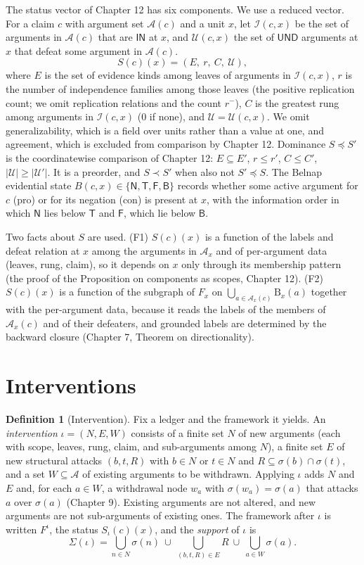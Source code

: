 \documentclass[11pt]{article}
\theoremstyle{plain}
\theoremstyle{definition}
\newtheorem{definition}[theorem]{Definition}
\theoremstyle{remark}
\newcommand{\IN}{\textsf{IN}}
\newcommand{\UND}{\textsf{UND}}
\newcommand{\Bc}{\mathrm{B}}
\begin{document}
The status vector of Chapter 12 has six components. We use a reduced vector. For a claim $c$ with argument set $\mathcal A(c)$ and a unit $x$, let $\mathcal I(c,x)$ be the set of arguments in $\mathcal A(c)$ that are $\IN$ at $x$, and $\mathcal U(c,x)$ the set of $\UND$ arguments at $x$ that defeat some argument in $\mathcal A(c)$.
\[
S(c)(x)=(E,\ r,\ C,\ \mathcal U),
\]
where $E$ is the set of evidence kinds among leaves of arguments in $\mathcal I(c,x)$, $r$ is the number of independence families among those leaves (the positive replication count; we omit replication relations and the count $r^-$), $C$ is the greatest rung among arguments in $\mathcal I(c,x)$ ($0$ if none), and $\mathcal U=\mathcal U(c,x)$. We omit generalizability, which is a field over units rather than a value at one, and agreement, which is excluded from comparison by Chapter 12. Dominance $S\preceq S'$ is the coordinatewise comparison of Chapter 12: $E\subseteq E'$, $r\le r'$, $C\le C'$, $|\mathcal U|\ge|\mathcal U'|$. It is a preorder, and $S\prec S'$ when also not $S'\preceq S$. The Belnap evidential state $B(c,x)\in\{\mathsf N,\mathsf T,\mathsf F,\mathsf B\}$ records whether some active argument for $c$ (pro) or for its negation (con) is present at $x$, with the information order in which $\mathsf N$ lies below $\mathsf T$ and $\mathsf F$, which lie below $\mathsf B$.

Two facts about $S$ are used. (F1) $S(c)(x)$ is a function of the labels and defeat relation at $x$ among the arguments in $\mathcal A_x$ and of per-argument data (leaves, rung, claim), so it depends on $x$ only through its membership pattern (the proof of the Proposition on components as scopes, Chapter 12). (F2) $S(c)(x)$ is a function of the subgraph of $F_x$ on $\bigcup_{a\in\mathcal A_x(c)}\Bc_x(a)$ together with the per-argument data, because it reads the labels of the members of $\mathcal A_x(c)$ and of their defeaters, and grounded labels are determined by the backward closure (Chapter 7, Theorem on directionality).

\section{Interventions}\label{sec:interventions}

\begin{definition}[Intervention]\label{def:interv}
Fix a ledger and the framework it yields. An \emph{intervention} $\iota=(N,E,W)$ consists of a finite set $N$ of new arguments (each with scope, leaves, rung, claim, and sub-arguments among $N$), a finite set $E$ of new structural attacks $(b,t,R)$ with $b\in N$ or $t\in N$ and $R\subseteq\sigma(b)\cap\sigma(t)$, and a set $W\subseteq\mathcal A$ of existing arguments to be withdrawn. Applying $\iota$ adds $N$ and $E$ and, for each $a\in W$, a withdrawal node $w_a$ with $\sigma(w_a)=\sigma(a)$ that attacks $a$ over $\sigma(a)$ (Chapter 9). Existing arguments are not altered, and new arguments are not sub-arguments of existing ones. The framework after $\iota$ is written $F^\iota$, the status $S_\iota(c)(x)$, and the \emph{support} of $\iota$ is
\[
\Sigma(\iota)=\bigcup_{n\in N}\sigma(n)\ \cup\ \bigcup_{(b,t,R)\in E}R\ \cup\ \bigcup_{a\in W}\sigma(a).
\]
\end{definition}
\end{document}
